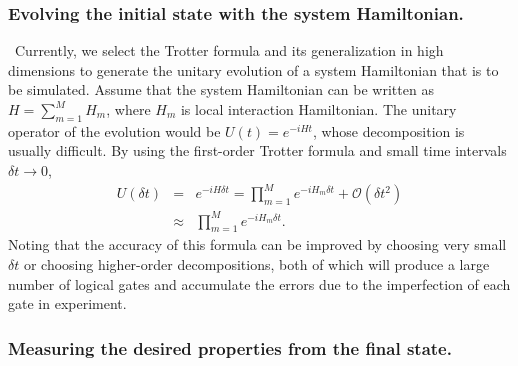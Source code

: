 \documentclass[8.5pt,twoside,twocolumn]{article}
\begin{document}
\subsubsection{Evolving the initial state with the system Hamiltonian.}

\ Currently, we select the Trotter formula\cite{first_quantization_2}
and its generalization in high dimensions\cite{Trotter_1,Trotter_2}
to generate the unitary evolution
of a system Hamiltonian that is to be simulated. Assume that the system Hamiltonian can be written as $H = \sum_{m=1}^MH_m$,
where $H_m$ is local interaction Hamiltonian. The unitary operator of the evolution would be $U(t) = e^{-iHt}$, whose decomposition is usually difficult.
By using the first-order Trotter formula and small time intervals $\delta t \rightarrow 0$,
\begin{eqnarray}\label{trotter}
 U(\delta t) & = & e^{-iH\delta t} = \prod\limits_{m=1}^M e^{-iH_m\delta t}+\mathcal {O}(\delta t^2)\nonumber \\
 & \approx & \prod\limits_{m=1}^M e^{-iH_m\delta t}.
\end{eqnarray}
Noting that the accuracy of this formula can be improved by choosing very small $\delta t$ or choosing higher-order decompositions, both of which will produce a large number of logical gates and accumulate the errors due to the imperfection of each gate in experiment.


\subsubsection{Measuring the desired properties from the final state.}
\end{document}
